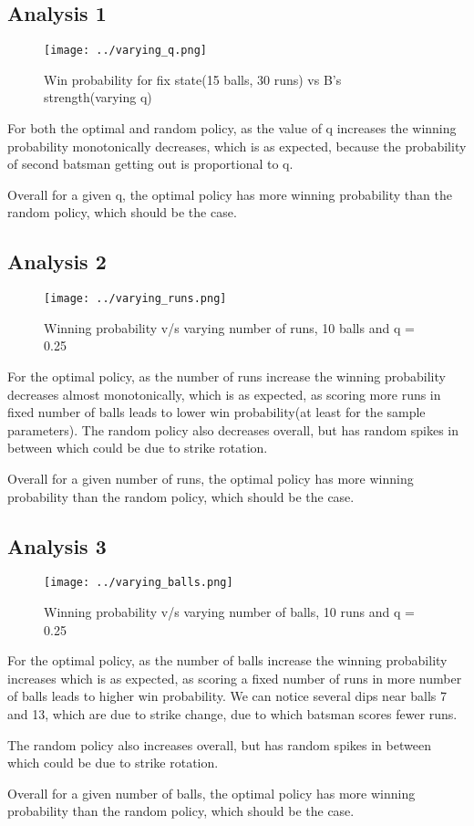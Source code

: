 \documentclass{article}
\begin{document}
\subsection{Analysis 1}
\begin{figure}[H]
    \centerline{\texttt{[image: ../varying\_q.png]}}
    \caption{Win probability for fix state(15 balls, 30 runs) vs B's strength(varying q)}
\end{figure}

\newpage
\thispagestyle{fancy}
For both the optimal and random policy, as the value of q increases the winning probability monotonically decreases, which
is as expected, because the probability of second batsman getting out is proportional to q.

Overall for a given q, the optimal policy has more winning probability than the random policy, which 
should be the case.

\subsection{Analysis 2}
\begin{figure}[H]
    \centerline{\texttt{[image: ../varying\_runs.png]}}
    \caption{Winning probability v/s varying number of runs, 10 balls and q = 0.25}
\end{figure}
For the optimal policy, as the number of runs increase the winning probability decreases almost monotonically, which
is as expected, as scoring more runs in fixed number of balls leads to lower win probability(at least for the sample parameters).
The random policy also decreases overall, but has random spikes in between which could be due to strike rotation.

Overall for a given number of runs, the optimal policy has more winning probability than the random policy, which 
should be the case.

\newpage
\thispagestyle{fancy}

\subsection{Analysis 3}
\begin{figure}[H]
    \centerline{\texttt{[image: ../varying\_balls.png]}}
    \caption{Winning probability v/s varying number of balls, 10 runs and q = 0.25}
\end{figure}
For the optimal policy, as the number of balls increase the winning probability increases which
is as expected, as scoring a fixed number of runs in more number of balls leads to higher win probability.
We can notice several dips near balls 7 and 13, which are due to strike change, due to which batsman scores fewer runs.

The random policy also increases overall, but has random spikes in between which could be due to strike rotation.

Overall for a given number of balls, the optimal policy has more winning probability than the random policy, which 
should be the case.
\newpage
\thispagestyle{fancy}
\end{document}
